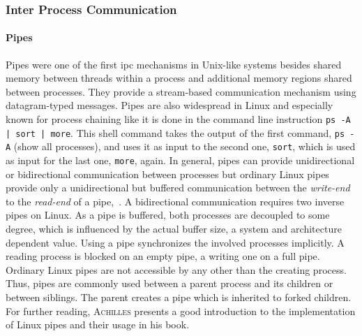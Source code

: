 \subsubsection*{Inter Process Communication}
\paragraph{Pipes}
Pipes were one of the first \ac{ipc} mechanisms in Unix-like systems besides shared memory between threads within a process and additional memory regions shared between processes.
They provide a stream-based communication mechanism using datagram-typed messages.
Pipes are also widespread in Linux and especially known for process chaining like it is done in the command line instruction \texttt{ps -A | sort | more}.
This shell command takes the output of the first command, \texttt{ps -A} (show all processes), and uses it as input to the second one, \texttt{sort}, which is used as input for the last one, \texttt{more}, again.
In general, pipes can provide unidirectional or bidirectional communication between processes but ordinary Linux pipes provide only a unidirectional but buffered communication between the \textit{write-end} to the \textit{read-end} of a pipe\cite{glatz2015betriebssysteme},~\cite{silberschatz2009operating}.
A bidirectional communication requires two inverse pipes on Linux\cite{silberschatz2009operating}.
As a pipe is buffered, both processes are decoupled to some degree, which is influenced by the actual buffer size, a system and architecture dependent value.
Using a pipe synchronizes the involved processes implicitly.
A reading process is blocked on an empty pipe, a writing one on a full pipe\cite{glatz2015betriebssysteme}.
Ordinary Linux pipes are not accessible by any other than the creating process.
Thus, pipes are commonly used between a parent process and its children or between siblings.
The parent creates a pipe which is inherited to forked children\cite{silberschatz2009operating}.
For further reading, \textsc{Achilles} presents a good introduction to the implementation of Linux pipes and their usage in his book\cite{achilles2006betriebssysteme}. 

